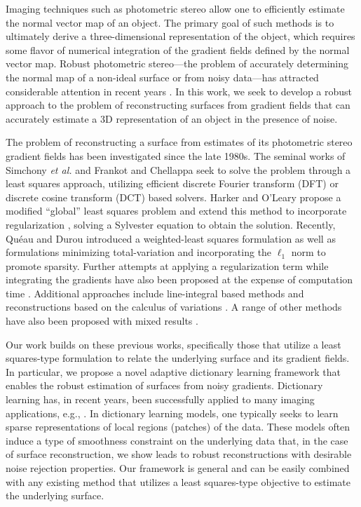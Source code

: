 
Imaging techniques such as photometric stereo \cite{woodham1980} allow one to efficiently estimate the normal vector map of an object. The primary goal of such methods is to ultimately derive a three-dimensional representation of the object, which requires some flavor of numerical integration of the gradient fields defined by the normal vector map. Robust photometric stereo---the problem of accurately determining the normal map of a non-ideal surface or from noisy data---has attracted considerable attention in recent years \cite{wu2011,ikehata2012,ikehata2014}. In this work, we seek to develop a robust approach to the problem of reconstructing surfaces from gradient fields that can accurately estimate a 3D representation of an object in the presence of noise.

The problem of reconstructing a surface from estimates of its photometric stereo gradient fields has been investigated since the late 1980s. The seminal works of Simchony \textit{et al.} \cite{simchony1990} and Frankot and Chellappa \cite{frankot1988} seek to solve the problem through a least squares approach, utilizing efficient discrete Fourier transform (DFT) or discrete cosine transform (DCT) based solvers.
Harker and O'Leary \cite{harker2008} propose a modified ``global'' least squares problem and extend this method to incorporate regularization \cite{harker2015}, solving a Sylvester equation to obtain the solution. Recently, Qu\'{e}au and Durou \cite{queau2015} introduced a weighted-least squares formulation as well as formulations minimizing total-variation and incorporating the $\ell_1$ norm to promote sparsity. Further attempts at applying a regularization term while integrating the gradients have also been proposed at the expense of computation time \cite{agrawal2006,ng2010}. Additional approaches include line-integral based methods \cite{wu1988,robles2005} and reconstructions based on the calculus of variations \cite{horn1986,balzer2012,durou2007}. A range of other methods have also been proposed with mixed results \cite{horovitz2004,lee1993,karaccali2003,karaccali2004,kovesi2005,balzer2011}.

Our work builds on these previous works, specifically those that utilize a least squares-type formulation to relate the underlying surface and its gradient fields. In particular, we propose a novel adaptive dictionary learning framework that enables the robust estimation of surfaces from noisy gradients. Dictionary learning \cite{elad2006image,aharon2006rm,kreutz2003dictionary} has, in recent years, been successfully applied to many imaging applications, e.g.,  \cite{ravishankar2011mr,ravishankar2016lassi,ravishankar2016low}. In dictionary learning models, one typically seeks to learn sparse representations of local regions (patches) of the data. These models often induce a type of smoothness constraint on the underlying data that, in the case of surface reconstruction, we show leads to robust reconstructions with desirable noise rejection properties. Our framework is general and can be easily combined with any existing method that utilizes a least squares-type objective to estimate the underlying surface.
